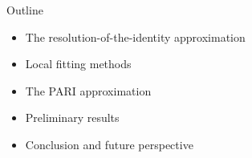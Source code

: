 

 
\begin{frame}{Outline}
\footnotesize

\begin{itemize}
\item The resolution-of-the-identity approximation
\item Local fitting methods
\item The PARI approximation
\item Preliminary results
\item Conclusion and future perspective
\end{itemize}
\end{frame}
 
